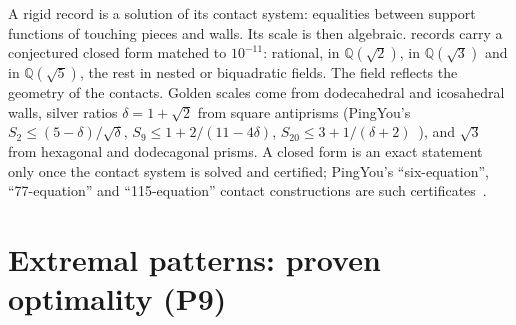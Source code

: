 \documentclass[11pt,a4paper]{article}
\newcommand{\Q}{\mathbb Q}
\theoremstyle{definition}
\theoremstyle{remark}
\begin{document}
A rigid record is a solution of its contact system: equalities between support functions of touching pieces and walls. Its scale is then algebraic. \nClosedForms{} records carry a conjectured closed form matched to $10^{-11}$: \nRational{} rational, \nSqrtTwo{} in $\Q(\sqrt2)$, \nSqrtThree{} in $\Q(\sqrt3)$ and \nSqrtFive{} in $\Q(\sqrt5)$, the rest in nested or biquadratic fields. The field reflects the geometry of the contacts. Golden scales come from dodecahedral and icosahedral walls, silver ratios $\delta=1+\sqrt2$ from square antiprisms (PingYou's $S_2\le(5-\delta)/\sqrt\delta$, $S_9\le1+2/(11-4\delta)$, $S_{20}\le3+1/(\delta+2)$~\cite{pingArrows}), and $\sqrt3$ from hexagonal and dodecagonal prisms. A closed form is an exact statement only once the contact system is solved and certified; PingYou's ``six-equation'', ``77-equation'' and ``115-equation'' contact constructions are such certificates~\cite{pingArrows}.

\section{Extremal patterns: proven optimality (P9)}\label{sec:extremal}
\end{document}
